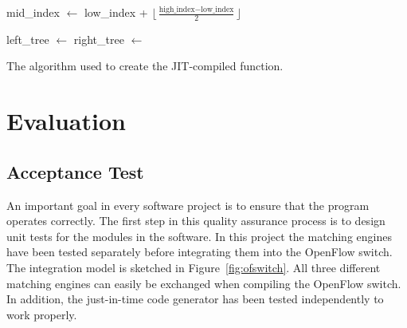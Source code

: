 \documentclass[a4paper,
		12pt,
		parskip=full,
		titlepage
		]{scrartcl}
\begin{document}
\begin{algorithm}
\begin{algorithmic}[1]
    \State mid\_index $\gets$ low\_index + $\lfloor\frac{\textrm{high\_index} - \textrm{low\_index}}{2}\rfloor$
    
    \State {}
        \State {}
        \State {}
        \State {}
        \State {} 
        \State {}
    \EndIf
    
    \State left\_tree $\gets$ 
    \State right\_tree $\gets$ 
    
    \State {}
    \State {}
    \State {}
    \State {}
    \State {}
    \State {}
    \State {}
    \State {}
\EndFunction
\end{algorithmic}
\caption{The algorithm used to create the JIT-compiled function.}
\label{alg:jit}
\end{algorithm}

\section{Evaluation}
\subsection{Acceptance Test}
An important goal in every software project is to ensure that the program operates correctly.
The first step in this quality assurance process is to design unit tests for the modules in the software.
In this project the matching engines have been tested separately before integrating them into the OpenFlow switch.
The integration model is sketched in Figure~\ref{fig:ofswitch}.
All three different matching engines can easily be exchanged when compiling the OpenFlow switch.
In addition, the just-in-time code generator has been tested independently to work properly.
\end{document}
